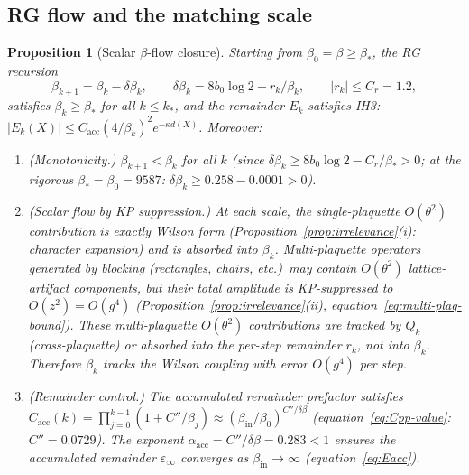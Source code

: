 \documentclass[11pt]{article}
\newtheorem{proposition}[theorem]{Proposition}
\theoremstyle{definition}
\begin{document}
\subsection{RG flow and the matching scale}

\begin{proposition}[Scalar $\beta$-flow closure]%
\label{prop:beta-flow}
Starting from $\beta_0=\beta\ge\beta_*$, the RG recursion
\begin{equation}\label{eq:beta-recursion}
\beta_{k+1}=\beta_k-\delta\beta_k,\qquad
\delta\beta_k=8b_0\log 2+r_k/\beta_k,\qquad
|r_k|\le C_r=1.2,
\end{equation}
satisfies $\beta_k\ge\beta_*$ for all $k\le k_*$, and the
remainder $E_k$ satisfies IH3:
$|E_k(X)|\le C_{\mathrm{acc}}(4/\beta_k)^2 e^{-\kappa d(X)}$.
Moreover:
\begin{enumerate}[nosep,label=(\roman*)]
\item \emph{(Monotonicity.)} $\beta_{k+1}<\beta_k$ for all $k$
(since $\delta\beta_k\ge 8b_0\log 2-C_r/\beta_*>0$;
at the rigorous $\beta_*=\beta_0=9587$:
$\delta\beta_k\ge 0.258-0.0001>0$).
\item \emph{(Scalar flow by KP suppression.)}
At each scale, the single-plaquette $O(\theta^2)$ contribution
is exactly Wilson form
(Proposition~\ref{prop:irrelevance}(i): character expansion)
and is absorbed into $\beta_k$.  Multi-plaquette operators
generated by blocking (rectangles, chairs, etc.)\ may
contain $O(\theta^2)$ lattice-artifact components, but their
total amplitude is KP-suppressed to $O(z^2)=O(g^4)$
(Proposition~\ref{prop:irrelevance}(ii),
equation~\eqref{eq:multi-plaq-bound}).  These multi-plaquette
$O(\theta^2)$ contributions are tracked by $Q_k$ (cross-plaquette) or absorbed into the per-step
remainder $r_k$, not into $\beta_k$.  Therefore $\beta_k$
tracks the Wilson coupling with error $O(g^4)$ per step.
\item \emph{(Remainder control.)} The accumulated remainder
prefactor satisfies
$C_{\mathrm{acc}}(k)=\prod_{j=0}^{k-1}(1+C''/\beta_j)
\approx(\beta_{\mathrm{in}}/\beta_0)^{C''/\delta\beta}$
(equation~\eqref{eq:Cpp-value}: $C''=0.0729$).
The exponent $\alpha_{\mathrm{acc}}=C''/\delta\beta=0.283<1$
ensures the accumulated remainder $\varepsilon_\infty$ converges
as $\beta_{\mathrm{in}}\to\infty$
(equation~\eqref{eq:Eacc}).
\end{enumerate}
\end{proposition}
\end{document}
